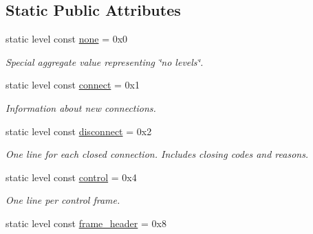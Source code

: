 \subsection*{Static Public Attributes}
\begin{DoxyCompactItemize}
\item 
static level const \hyperlink{structwebsocketpp_1_1log_1_1alevel_a4cf0520816094999975fe73081cf30f2}{none} = 0x0\hypertarget{structwebsocketpp_1_1log_1_1alevel_a4cf0520816094999975fe73081cf30f2}{}\label{structwebsocketpp_1_1log_1_1alevel_a4cf0520816094999975fe73081cf30f2}

\begin{DoxyCompactList}\small\item\em Special aggregate value representing \char`\"{}no levels\char`\"{}. \end{DoxyCompactList}\item 
static level const \hyperlink{structwebsocketpp_1_1log_1_1alevel_aac3e16b6df297567ba2533233d477d57}{connect} = 0x1
\begin{DoxyCompactList}\small\item\em Information about new connections. \end{DoxyCompactList}\item 
static level const \hyperlink{structwebsocketpp_1_1log_1_1alevel_af19681d3edb28e0407688eeda8f0005c}{disconnect} = 0x2\hypertarget{structwebsocketpp_1_1log_1_1alevel_af19681d3edb28e0407688eeda8f0005c}{}\label{structwebsocketpp_1_1log_1_1alevel_af19681d3edb28e0407688eeda8f0005c}

\begin{DoxyCompactList}\small\item\em One line for each closed connection. Includes closing codes and reasons. \end{DoxyCompactList}\item 
static level const \hyperlink{structwebsocketpp_1_1log_1_1alevel_ae67e6466bf3d9daf45cc865e8d48f445}{control} = 0x4\hypertarget{structwebsocketpp_1_1log_1_1alevel_ae67e6466bf3d9daf45cc865e8d48f445}{}\label{structwebsocketpp_1_1log_1_1alevel_ae67e6466bf3d9daf45cc865e8d48f445}

\begin{DoxyCompactList}\small\item\em One line per control frame. \end{DoxyCompactList}\item 
static level const \hyperlink{structwebsocketpp_1_1log_1_1alevel_ac25fc7cb5fc229abb6fc893f16ffb678}{frame\+\_\+header} = 0x8\hypertarget{structwebsocketpp_1_1log_1_1alevel_ac25fc7cb5fc229abb6fc893f16ffb678}{}\label{structwebsocketpp_1_1log_1_1alevel_ac25fc7cb5fc229abb6fc893f16ffb678}


\end{DoxyCompactItemize}
